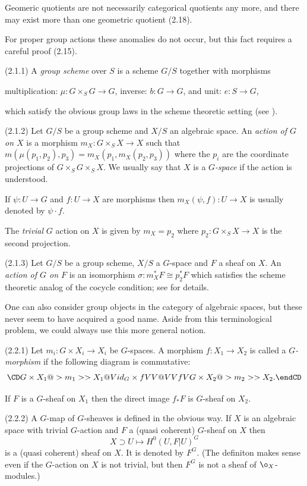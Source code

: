 Geomeric quotients  are not necessarily categorical quotients any more, and
there may exist more than one geometric quotient (2.18).

For proper group actions these anomalies do not occur, but this fact requires
a careful proof (2.15).


  (2.1.1)  A {\it group scheme} over $S$ is
 a scheme $G/S$ together with morphisms

multiplication: $\mu:G\times_S G\to G$, inverse: $b:G\to G$,  and
unit: $e:S\to G$,

\noindent which satisfy the obvious group laws in the scheme theoretic setting
(see \cite{Mumford-Fogarty82, 0.1}).

(2.1.2) Let $G/S$ be a group scheme and $X/S$ an algebraic space.
An {\it action of $G$ on $X$} is a morphism
$m_X:G\times_SX\to X$ such that
$m(\mu(p_1,p_2),p_3)=m_X(p_1,m_X(p_2,p_3))$ where the $p_i$ are the coordinate
projections of $G\times_SG\times_SX$.
We usually say that $X$ is a {\it $G$-space} if the action is
understood.

If $\psi:U\to G$ and $f:U\to X$ are morphisms then $m_X(\psi, f):U\to X$ is
usually denoted by $\psi\cdot f$.

The {\it trivial} $G$ action on $X$ is given by $m_X=p_2$ where
$p_2:G\times_SX\to X$ is the second projection.

(2.1.3) Let $G/S$ be a group scheme, $X/S$ a $G$-space and  $F$ a sheaf on
$X$. An {\it action of
$G$ on $F$} is an isomorphism $\sigma:m_X^*F\cong p_2^*F$ which satisfies the
scheme theoretic analog of the cocycle condition; see
\cite{Mumford-Fogarty82, 1.3} for details.
\enddemo

 One can  also  consider group objects in the category of
algebraic spaces, but these never seem to have acquired a good name. Aside
from this  terminological problem, we could always use this more
general notion.
\enddemo

  (2.2.1) Let $m_i:G\times X_i\to X_i$ be
$G$-spaces. A
morphism
$f:X_1\to X_2$ is called  a {\it $G$-morphism} if
the following  diagram is commutative:
$$
\CD
G\times X_1@>m_1>> X_1\\
@V{id_G\times f}VV @VV{f}V\\
G\times X_2@>m_2>> X_2.
\endCD
$$

If $F$ is a $G$-sheaf on $X_1$ then the  direct image $f_*F$ is
$G$-sheaf on $X_2$.

(2.2.2) A $G$-map of $G$-sheaves is defined in the obvious way. If $X$ is
an algebraic space with trivial $G$-action and $F$  a  (quasi coherent)
$G$-sheaf on $X$ then
$$
X\supset U\mapsto H^0(U,F|U)^G
$$
is a (quasi coherent) sheaf on $X$. It is denoted by $F^G$.
(The definiton makes sense even if the $G$-action on $X$ is not trivial, but
then $F^G$ is not a sheaf of $\o_X$-modules.)
\enddemo


